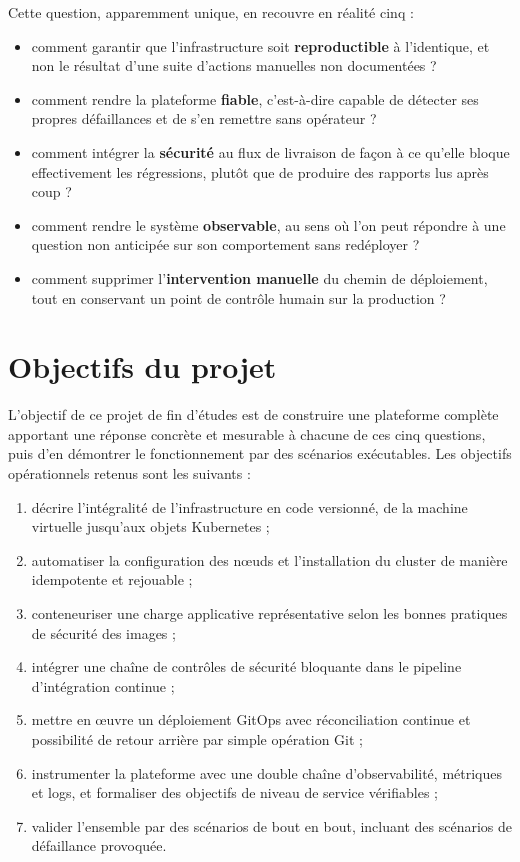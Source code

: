\documentclass[12pt,a4paper,twoside,openright]{report}
\begin{document}
Cette question, apparemment unique, en recouvre en réalité cinq :

\begin{itemize}[itemsep=2pt]
  \item comment garantir que l'infrastructure soit \textbf{reproductible} à
        l'identique, et non le résultat d'une suite d'actions manuelles non
        documentées ?
  \item comment rendre la plateforme \textbf{fiable}, c'est-à-dire capable de
        détecter ses propres défaillances et de s'en remettre sans opérateur ?
  \item comment intégrer la \textbf{sécurité} au flux de livraison de façon à ce
        qu'elle bloque effectivement les régressions, plutôt que de produire des
        rapports lus après coup ?
  \item comment rendre le système \textbf{observable}, au sens où l'on peut répondre
        à une question non anticipée sur son comportement sans redéployer ?
  \item comment supprimer l'\textbf{intervention manuelle} du chemin de déploiement,
        tout en conservant un point de contrôle humain sur la production ?
\end{itemize}

\section*{Objectifs du projet}

L'objectif de ce projet de fin d'études est de construire une plateforme complète
apportant une réponse concrète et mesurable à chacune de ces cinq questions, puis
d'en démontrer le fonctionnement par des scénarios exécutables. Les objectifs
opérationnels retenus sont les suivants :

\begin{enumerate}[itemsep=2pt]
  \item décrire l'intégralité de l'infrastructure en code versionné, de la machine
        virtuelle jusqu'aux objets Kubernetes ;
  \item automatiser la configuration des n\oe uds et l'installation du cluster de
        manière idempotente et rejouable ;
  \item conteneuriser une charge applicative représentative selon les bonnes
        pratiques de sécurité des images ;
  \item intégrer une chaîne de contrôles de sécurité bloquante dans le pipeline
        d'intégration continue ;
  \item mettre en \oe uvre un déploiement GitOps avec réconciliation continue et
        possibilité de retour arrière par simple opération Git ;
  \item instrumenter la plateforme avec une double chaîne d'observabilité, métriques
        et logs, et formaliser des objectifs de niveau de service vérifiables ;
  \item valider l'ensemble par des scénarios de bout en bout, incluant des scénarios
        de défaillance provoquée.
\end{enumerate}
\end{document}
